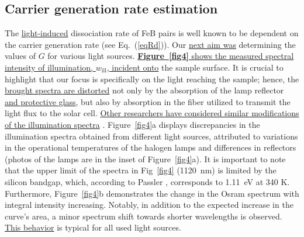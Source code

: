 \documentclass{WileyMSP-template}
\begin{document}
\subsection{Carrier generation rate estimation}\label{SecG}

The \textcolor[rgb]{0.00,0.07,1.00}{\uline{light-induced}} dissociation rate of FeB pairs is well known
to be dependent on the carrier generation rate (see Eq.~(\ref{eqRd})).
Our \textcolor[rgb]{0.00,0.07,1.00}{\uline{next aim was}} determining the values of $G$ for various light sources.
\textcolor[rgb]{0.00,0.07,1.00}{\uline{\textbf{Figure~\ref{fig4}} shows the measured spectral intensity of illumination, $w_\mathrm{ill}$, incident onto}} the sample surface.
It is crucial to highlight that our focus is specifically on the light reaching the sample;
hence, the \textcolor[rgb]{0.00,0.07,1.00}{\uline{brought spectra are distorted}} not only by the absorption of the lamp reflector 
\textcolor[rgb]{0.00,0.07,1.00}{\uline{and protective glass}}, but also by absorption in the fiber
utilized to transmit the light flux to the solar cell.
\textcolor[rgb]{0.00,0.07,1.00}{\uline{Other researchers have considered similar modifications of the illumination spectra}} \cite{Libra2017}.
Figure~\ref{fig4}a displays discrepancies in the illumination spectra obtained from different light sources,
attributed to variations in the operational temperatures of the halogen lamps and differences in reflectors
(photos of the lamps are in the inset of Figure~\ref{fig4}a).
It is important to note that the upper limit of the spectra in Fig~\ref{fig4} (1120~nm)
is limited by the silicon bandgap, which, according to Passler \cite{Pasler}, corresponds to 1.11~eV at 340 K.
Furthermore, Figure~\ref{fig4}b demonstrates the change in the Osram spectrum with integral intensity increasing.
Notably, in addition to the expected increase in the curve's area, a minor spectrum shift towards shorter wavelengths is observed.
\textcolor[rgb]{0.00,0.07,1.00}{\uline{This behavior}} is typical for all used light sources.
\end{document}
